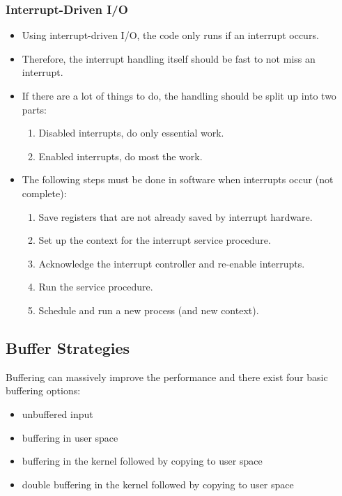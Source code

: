 \documentclass[a4paper, 11pt, accentcolor = tud3b]{tudreport}
\begin{document}
                \subsubsection{Interrupt-Driven I/O}
                    \begin{itemize}
                    	\item Using interrupt-driven I/O, the code only runs if an interrupt occurs.
                    	\item Therefore, the interrupt handling itself should be fast to not miss an interrupt.
                    	\item If there are a lot of things to do, the handling should be split up into two parts:
	                    	\begin{enumerate}
	                    		\item Disabled interrupts, do only essential work.
	                    		\item Enabled interrupts, do most the work.
	                    	\end{enumerate}
                    	\item The following steps must be done in software when interrupts occur (not complete):
	                    	\begin{enumerate}
	                    		\item Save registers that are not already saved by interrupt hardware.
	                    		\item Set up the context for the interrupt service procedure.
	                    		\item Acknowledge the interrupt controller and re-enable interrupts.
	                    		\item Run the service procedure.
	                    		\item Schedule and run a new process (and new context).
	                    	\end{enumerate}
                    \end{itemize}

            \subsection{Buffer Strategies}
	            Buffering can massively improve the performance and there exist four basic buffering options:
                \begin{itemize}
                	\item unbuffered input
                	\item buffering in user space
                	\item buffering in the kernel followed by copying to user space
                	\item double buffering in the kernel followed by copying to user space
                \end{itemize}
\end{document}
